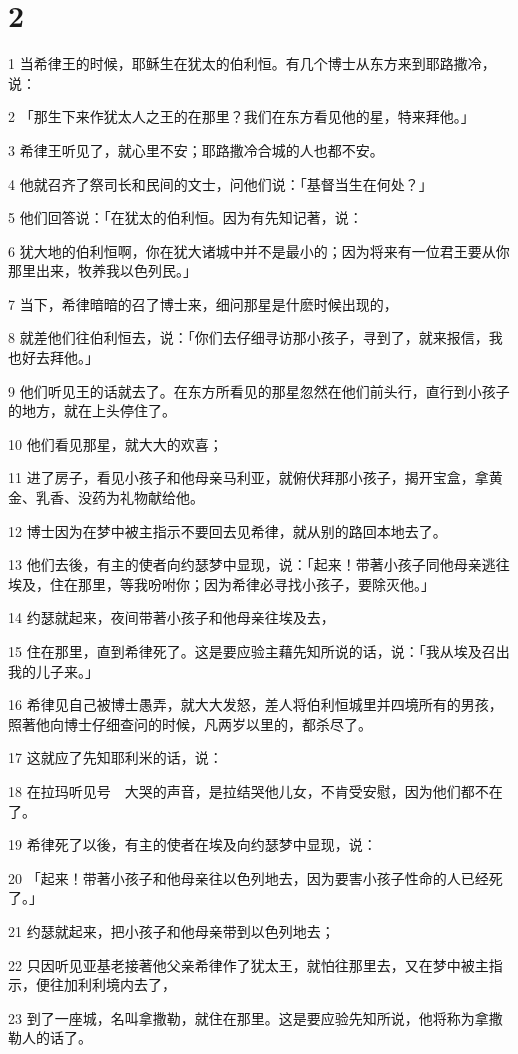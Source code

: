 \chapter{2}

\par 1 当希律王的时候，耶稣生在犹太的伯利恒。有几个博士从东方来到耶路撒冷，说：
\par 2 「那生下来作犹太人之王的在那里？我们在东方看见他的星，特来拜他。」
\par 3 希律王听见了，就心里不安；耶路撒冷合城的人也都不安。
\par 4 他就召齐了祭司长和民间的文士，问他们说：「基督当生在何处？」
\par 5 他们回答说：「在犹太的伯利恒。因为有先知记著，说：
\par 6 犹大地的伯利恒啊，你在犹大诸城中并不是最小的；因为将来有一位君王要从你那里出来，牧养我以色列民。」
\par 7 当下，希律暗暗的召了博士来，细问那星是什麽时候出现的，
\par 8 就差他们往伯利恒去，说：「你们去仔细寻访那小孩子，寻到了，就来报信，我也好去拜他。」
\par 9 他们听见王的话就去了。在东方所看见的那星忽然在他们前头行，直行到小孩子的地方，就在上头停住了。
\par 10 他们看见那星，就大大的欢喜；
\par 11 进了房子，看见小孩子和他母亲马利亚，就俯伏拜那小孩子，揭开宝盒，拿黄金、乳香、没药为礼物献给他。
\par 12 博士因为在梦中被主指示不要回去见希律，就从别的路回本地去了。
\par 13 他们去後，有主的使者向约瑟梦中显现，说：「起来！带著小孩子同他母亲逃往埃及，住在那里，等我吩咐你；因为希律必寻找小孩子，要除灭他。」
\par 14 约瑟就起来，夜间带著小孩子和他母亲往埃及去，
\par 15 住在那里，直到希律死了。这是要应验主藉先知所说的话，说：「我从埃及召出我的儿子来。」
\par 16 希律见自己被博士愚弄，就大大发怒，差人将伯利恒城里并四境所有的男孩，照著他向博士仔细查问的时候，凡两岁以里的，都杀尽了。
\par 17 这就应了先知耶利米的话，说：
\par 18 在拉玛听见号　大哭的声音，是拉结哭他儿女，不肯受安慰，因为他们都不在了。
\par 19 希律死了以後，有主的使者在埃及向约瑟梦中显现，说：
\par 20 「起来！带著小孩子和他母亲往以色列地去，因为要害小孩子性命的人已经死了。」
\par 21 约瑟就起来，把小孩子和他母亲带到以色列地去；
\par 22 只因听见亚基老接著他父亲希律作了犹太王，就怕往那里去，又在梦中被主指示，便往加利利境内去了，
\par 23 到了一座城，名叫拿撒勒，就住在那里。这是要应验先知所说，他将称为拿撒勒人的话了。

